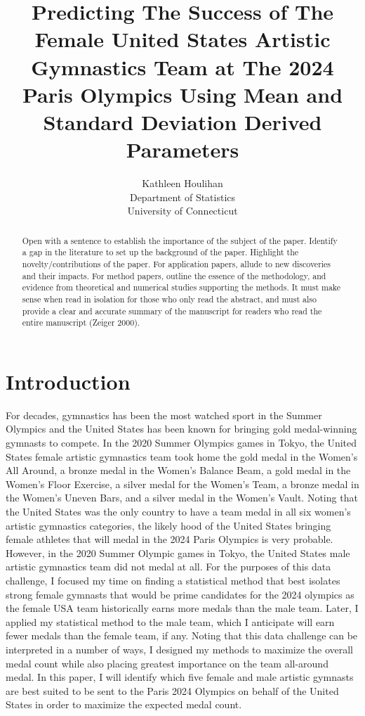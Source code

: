 \documentclass[12pt]{article}
\title{Predicting The Success of The Female United States Artistic Gymnastics Team at The 2024 Paris Olympics 
Using Mean and Standard Deviation Derived Parameters}
\author{Kathleen Houlihan\\
  Department of Statistics\\
  University of Connecticut
}
\begin{document}
\maketitle

\begin{abstract}
    
  Open with a sentence to establish the importance of the subject of the paper.
  Identify a gap in the literature to set up the background of the paper.
  Highlight the novelty/contributions of the paper.
  For application papers, allude to new discoveries and their impacts.
  For method papers, outline the essence of the methodology, and evidence from theoretical and numerical studies supporting the methods.
  It must make sense when read in isolation for those who only read the abstract, and must also provide a clear and accurate summary of the manuscript for readers who read the entire manuscript (Zeiger 2000).

\end{abstract}

\section{Introduction}
\label{sec:intro}

For decades, gymnastics has been the most watched sport in the Summer Olympics and the United States 
has been known for bringing gold medal-winning gymnasts to compete. In the 2020 
Summer Olympics games in Tokyo, the United States female artistic gymnastics team took home 
the gold medal in the Women's All Around, a bronze medal in the Women's Balance 
Beam, a gold medal in the Women's Floor Exercise, a silver medal for the Women's
Team, a bronze medal in the Women's Uneven Bars, and a silver medal in the Women's Vault. 
Noting that the United States was the only country to have a team medal in all six women's artistic gymnastics 
categories, the likely hood of the United States bringing female athletes that will medal in the 2024 
Paris Olympics is very probable. However, in the 2020 Summer Olympic games in Tokyo, the United States 
male artistic gymnastics team did not medal at all. For the purposes of this data challenge, I focused my 
time on finding a statistical method that best isolates strong female gymnasts that would be prime candidates 
for the 2024 olympics as the female USA team historically earns more medals than the male team. Later, I applied 
my statistical method to the male team, which I anticipate will earn fewer medals than the female team, if any. 
Noting that this data challenge can be interpreted in a number of ways, I designed my methods to maximize the 
overall medal count while also placing greatest importance on the team all-around medal. In this paper, I will 
identify which five female and male artistic gymnasts are best suited to be sent to the Paris 2024 
Olympics on behalf of the United States in order to maximize the expected medal count. 
\end{document}

